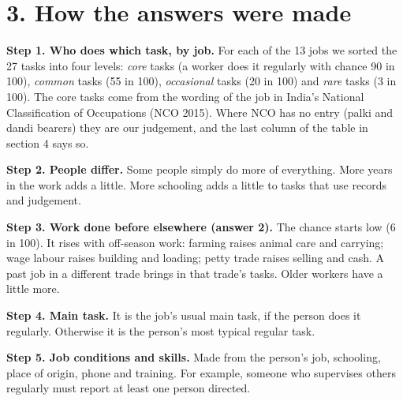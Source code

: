 \documentclass[11pt]{article}
\begin{document}
\section*{3. How the answers were made}
\textbf{Step 1. Who does which task, by job.} For each of the 13 jobs we sorted the 27 tasks into four levels:
\emph{core} tasks (a worker does it regularly with chance 90 in 100), \emph{common} tasks (55 in 100),
\emph{occasional} tasks (20 in 100) and \emph{rare} tasks (3 in 100).
The core tasks come from the wording of the job in India's National Classification of Occupations (NCO 2015).
Where NCO has no entry (palki and dandi bearers) they are our judgement, and the last column of the table in section 4 says so.

\textbf{Step 2. People differ.} Some people simply do more of everything. More years in the work adds a little.
More schooling adds a little to tasks that use records and judgement.

\textbf{Step 3. Work done before elsewhere (answer 2).} The chance starts low (6 in 100).
It rises with off-season work: farming raises animal care and carrying; wage labour raises building and loading;
petty trade raises selling and cash. A past job in a different trade brings in that trade's tasks. Older workers have a little more.

\textbf{Step 4. Main task.} It is the job's usual main task, if the person does it regularly.
Otherwise it is the person's most typical regular task.

\textbf{Step 5. Job conditions and skills.} Made from the person's job, schooling, place of origin, phone and training.
For example, someone who supervises others regularly must report at least one person directed.
\end{document}
